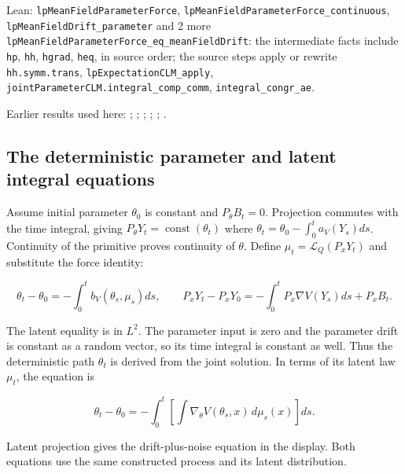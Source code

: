 \documentclass[11pt,a4paper]{report}
\begin{document}
\begin{leanbox}{Lean: \texttt{lpMeanFieldParameterForce}, \texttt{lpMeanFieldParameterForce\_\allowbreak{}continuous}, \texttt{lpMeanFieldDrift\_\allowbreak{}parameter} and 2 more}
\texttt{lp\allowbreak{}Mean\allowbreak{}Field\allowbreak{}Parameter\allowbreak{}Force\_\allowbreak{}eq\_\allowbreak{}mean\allowbreak{}Field\allowbreak{}Drift}: the intermediate facts include \texttt{hp}, \texttt{hh}, \texttt{hgrad}, \texttt{heq}, in source order; the source steps apply or rewrite \texttt{hh.\allowbreak{}symm.\allowbreak{}trans}, \texttt{lp\allowbreak{}Expectation\allowbreak{}CLM\_\allowbreak{}apply}, \texttt{joint\allowbreak{}Parameter\allowbreak{}CLM.\allowbreak{}integral\_\allowbreak{}comp\_\allowbreak{}comm}, \texttt{integral\_\allowbreak{}congr\_\allowbreak{}ae}.
\end{leanbox}


Earlier results used here: \cite[Section~3.13.2]{LangevinLean2026ULASC}; \cite[Section~3.13.3]{LangevinLean2026ULASC}; \cite[Section~3.13.4]{LangevinLean2026ULASC}; \cite[Section~3.13.5]{LangevinLean2026ULASC}; \cite[Section~3.1.1]{LangevinLean2026IPLA}; \cite[Section~3.11.1]{LangevinLean2026IPLA}.
\subsection{\texorpdfstring{The deterministic parameter and latent integral equations}{The deterministic parameter and latent integral equations}}
\label{report-step-ProximalLangevin-MeanFieldProcess-lean-8}


Assume initial parameter \(\theta_0\) is constant and \(P_\theta B_t=0\). Projection commutes with the time integral, giving \(P_\theta Y_t=\operatorname{const}(\theta_t)\) where \(\theta_t=\theta_0-\int_0^t a_V(Y_s)ds\). Continuity of the primitive proves continuity of \(\theta\). Define \(\mu_t=\mathcal L_Q(P_xY_t)\) and substitute the force identity:

\[\theta_t-\theta_0=-\int_0^t b_V(\theta_s,\mu_s)ds,\qquad P_xY_t-P_xY_0=-\int_0^tP_x\nabla V(Y_s)ds+P_xB_t.\]

The latent equality is in \(L^2\). The parameter input is zero and the parameter drift is constant as a random vector, so its time integral is constant as well. Thus the deterministic path \(\theta_t\) is derived from the joint solution. In terms of its latent law \(\mu_t\), the equation is

\[\theta_t-\theta_0=-\int_0^t\left[\int\nabla_\theta V(\theta_s,x)\,d\mu_s(x)\right]ds.\]

Latent projection gives the drift-plus-noise equation in the display. Both equations use the same constructed process and its latent distribution.
\end{document}
